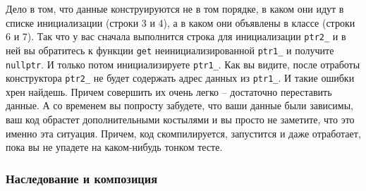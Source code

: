 Дело в том, что данные конструируются не в том порядке, в каком они идут в списке инициализации (строки 3 и 4), а в каком они объявлены в классе (строки 6 и 7).
Так что у вас сначала выполнится строка для инициализации \verb"ptr2_" и в ней вы обратитесь к функции \verb"get" неинициализированной \verb"ptr1_" и получите \verb"nullptr".
И только потом инициализируете \verb"ptr1_".
Как вы видите, после отработы конструктора \verb"ptr2_" не будет содержать адрес данных из \verb"ptr1_".
И такие ошибки хрен найдешь.
Причем совершить их очень легко -- достаточно переставить данные.
А со временем вы попросту забудете, что ваши данные были зависимы, ваш код обрастет дополнительными костылями и вы просто не заметите, что это именно эта ситуация.
Причем, код скомпилируется, запустится и даже отработает, пока вы не упадете на каком-нибудь тонком тесте.

\subsubsection{Наследование и композиция}
\label{section::Composition}

